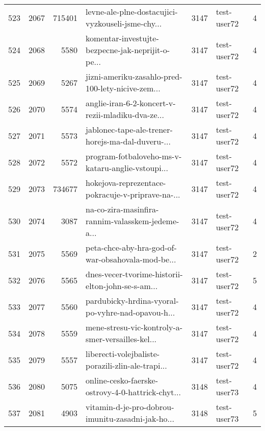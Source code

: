 \begin{tabular}{lrrlrlr}
523  &       2067 &   715401 &  levne-ale-plne-dostacujici-vyzkouseli-jsme-chy... &     3147 &                  test-user72 &               4 \\
524  &       2068 &     5580 &  komentar-investujte-bezpecne-jak-neprijit-o-pe... &     3147 &                  test-user72 &               4 \\
525  &       2069 &     5267 &  jizni-ameriku-zasahlo-pred-100-lety-nicive-zem... &     3147 &                  test-user72 &               4 \\
526  &       2070 &     5574 &  anglie-iran-6-2-koncert-v-rezii-mladiku-dva-ze... &     3147 &                  test-user72 &               4 \\
527  &       2071 &     5573 &  jablonec-tape-ale-trener-horejs-ma-dal-duveru-... &     3147 &                  test-user72 &               4 \\
528  &       2072 &     5572 &  program-fotbaloveho-ms-v-kataru-anglie-vstoupi... &     3147 &                  test-user72 &               4 \\
529  &       2073 &   734677 &  hokejova-reprezentace-pokracuje-v-priprave-na-... &     3147 &                  test-user72 &               4 \\
530  &       2074 &     3087 &  na-co-zira-masinfira-rannim-valasskem-jedeme-a... &     3147 &                  test-user72 &               4 \\
531  &       2075 &     5569 &  peta-chce-aby-hra-god-of-war-obsahovala-mod-be... &     3147 &                  test-user72 &               2 \\
532  &       2076 &     5565 &  dnes-vecer-tvorime-historii-elton-john-se-s-am... &     3147 &                  test-user72 &               5 \\
533  &       2077 &     5560 &  pardubicky-hrdina-vyoral-po-vyhre-nad-opavou-h... &     3147 &                  test-user72 &               4 \\
534  &       2078 &     5559 &  mene-stresu-vic-kontroly-a-smer-versailles-kel... &     3147 &                  test-user72 &               4 \\
535  &       2079 &     5557 &  liberecti-volejbaliste-porazili-zlin-ale-trapi... &     3147 &                  test-user72 &               4 \\
536  &       2080 &     5075 &  online-cesko-faerske-ostrovy-4-0-hattrick-chyt... &     3148 &                  test-user73 &               4 \\
537  &       2081 &     4903 &  vitamin-d-je-pro-dobrou-imunitu-zasadni-jak-ho... &     3148 &                  test-user73 &               5 \\

\end{tabular}

